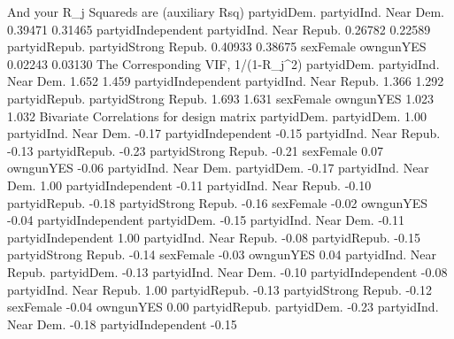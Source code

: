 \begin{Schunk}
\begin{Soutput}
And your R_j Squareds are (auxiliary Rsq)
            partyidDem.   partyidInd. Near Dem. 
                0.39471                 0.31465 
     partyidIndependent partyidInd. Near Repub. 
                0.26782                 0.22589 
          partyidRepub.    partyidStrong Repub. 
                0.40933                 0.38675 
              sexFemale               owngunYES 
                0.02243                 0.03130 
The Corresponding VIF, 1/(1-R_j^2)
            partyidDem.   partyidInd. Near Dem. 
                  1.652                   1.459 
     partyidIndependent partyidInd. Near Repub. 
                  1.366                   1.292 
          partyidRepub.    partyidStrong Repub. 
                  1.693                   1.631 
              sexFemale               owngunYES 
                  1.023                   1.032 
Bivariate Correlations for design matrix 
                        partyidDem.
partyidDem.                    1.00
partyidInd. Near Dem.         -0.17
partyidIndependent            -0.15
partyidInd. Near Repub.       -0.13
partyidRepub.                 -0.23
partyidStrong Repub.          -0.21
sexFemale                      0.07
owngunYES                     -0.06
                        partyidInd. Near Dem.
partyidDem.                             -0.17
partyidInd. Near Dem.                    1.00
partyidIndependent                      -0.11
partyidInd. Near Repub.                 -0.10
partyidRepub.                           -0.18
partyidStrong Repub.                    -0.16
sexFemale                               -0.02
owngunYES                               -0.04
                        partyidIndependent
partyidDem.                          -0.15
partyidInd. Near Dem.                -0.11
partyidIndependent                    1.00
partyidInd. Near Repub.              -0.08
partyidRepub.                        -0.15
partyidStrong Repub.                 -0.14
sexFemale                            -0.03
owngunYES                             0.04
                        partyidInd. Near Repub.
partyidDem.                               -0.13
partyidInd. Near Dem.                     -0.10
partyidIndependent                        -0.08
partyidInd. Near Repub.                    1.00
partyidRepub.                             -0.13
partyidStrong Repub.                      -0.12
sexFemale                                 -0.04
owngunYES                                  0.00
                        partyidRepub.
partyidDem.                     -0.23
partyidInd. Near Dem.           -0.18
partyidIndependent              -0.15

\end{Soutput}
\end{Schunk}

